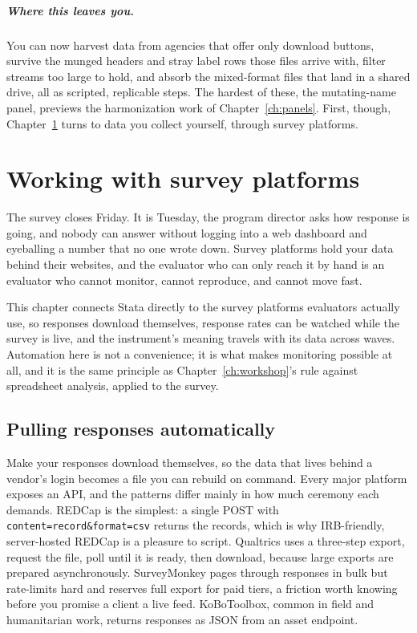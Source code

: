 \documentclass[
    a4paper,
    fontsize=10pt,
    twoside=true,
    numbers=noenddot,
]{kaobook}
\begin{document}
\paragraph{Where this leaves you.} You can now harvest data from agencies that offer only download buttons, survive the munged headers and stray label rows those files arrive with, filter streams too large to hold, and absorb the mixed-format files that land in a shared drive, all as scripted, replicable steps. The hardest of these, the mutating-name panel, previews the harmonization work of Chapter~\ref{ch:panels}. First, though, Chapter~\ref{ch:surveys} turns to data you collect yourself, through survey platforms.

\chapter{Working with survey platforms}\label{ch:surveys}

The survey closes Friday. It is Tuesday, the program director asks how response is going, and nobody can answer without logging into a web dashboard and eyeballing a number that no one wrote down. Survey platforms hold your data behind their websites, and the evaluator who can only reach it by hand is an evaluator who cannot monitor, cannot reproduce, and cannot move fast.

This chapter connects Stata directly to the survey platforms evaluators actually use, so responses download themselves, response rates can be watched while the survey is live, and the instrument's meaning travels with its data across waves. Automation here is not a convenience; it is what makes monitoring possible at all, and it is the same principle as Chapter~\ref{ch:workshop}'s rule against spreadsheet analysis, applied to the survey.

\section{Pulling responses automatically}
Make your responses download themselves, so the data that lives behind a vendor's login becomes a file you can rebuild on command. Every major platform exposes an API, and the patterns differ mainly in how much ceremony each demands. REDCap is the simplest: a single POST with \texttt{content=record\&format=csv} returns the records, which is why IRB-friendly, server-hosted REDCap is a pleasure to script. Qualtrics uses a three-step export, request the file, poll until it is ready, then download, because large exports are prepared asynchronously. SurveyMonkey pages through responses in bulk but rate-limits hard and reserves full export for paid tiers, a friction worth knowing before you promise a client a live feed. KoBoToolbox, common in field and humanitarian work, returns responses as JSON from an asset endpoint.
\end{document}
